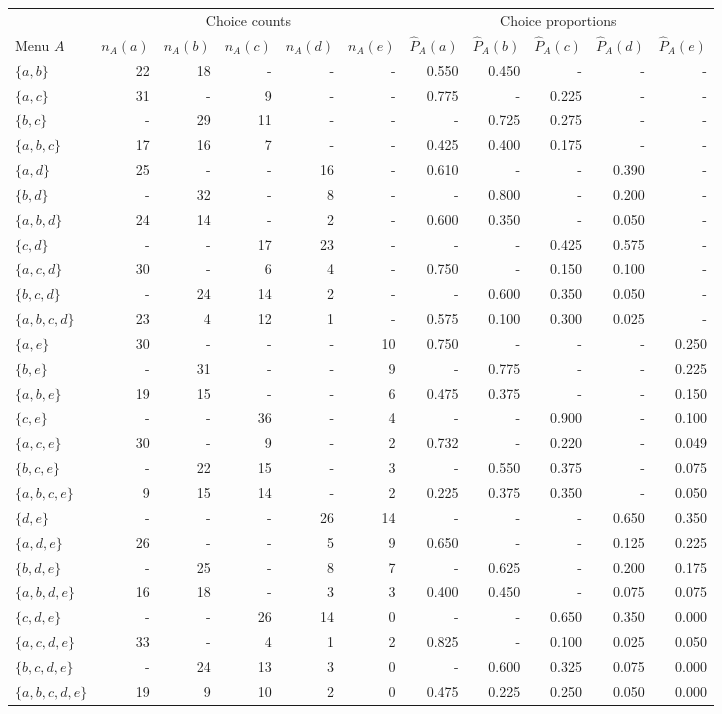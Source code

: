 
\begin{tabular}{lrrrrrrrrrr}
\toprule
\multicolumn{1}{c}{ } & \multicolumn{5}{c}{Choice counts} & \multicolumn{5}{c}{Choice proportions} \\
\cmidrule(l{3pt}r{3pt}){2-6} \cmidrule(l{3pt}r{3pt}){7-11}
Menu $A$ & $n_A(a)$ & $n_A(b)$ & $n_A(c)$ & $n_A(d)$ & $n_A(e)$ & $\hat P_A(a)$ & $\hat P_A(b)$ & $\hat P_A(c)$ & $\hat P_A(d)$ & $\hat P_A(e)$\\
\midrule
$\{a,b\}$ & 22 & 18 & - & - & - & 0.550 & 0.450 & - & - & -\\
$\{a,c\}$ & 31 & - & 9 & - & - & 0.775 & - & 0.225 & - & -\\
$\{b,c\}$ & - & 29 & 11 & - & - & - & 0.725 & 0.275 & - & -\\
$\{a,b,c\}$ & 17 & 16 & 7 & - & - & 0.425 & 0.400 & 0.175 & - & -\\
$\{a,d\}$ & 25 & - & - & 16 & - & 0.610 & - & - & 0.390 & -\\
\addlinespace
$\{b,d\}$ & - & 32 & - & 8 & - & - & 0.800 & - & 0.200 & -\\
$\{a,b,d\}$ & 24 & 14 & - & 2 & - & 0.600 & 0.350 & - & 0.050 & -\\
$\{c,d\}$ & - & - & 17 & 23 & - & - & - & 0.425 & 0.575 & -\\
$\{a,c,d\}$ & 30 & - & 6 & 4 & - & 0.750 & - & 0.150 & 0.100 & -\\
$\{b,c,d\}$ & - & 24 & 14 & 2 & - & - & 0.600 & 0.350 & 0.050 & -\\
\addlinespace
$\{a,b,c,d\}$ & 23 & 4 & 12 & 1 & - & 0.575 & 0.100 & 0.300 & 0.025 & -\\
$\{a,e\}$ & 30 & - & - & - & 10 & 0.750 & - & - & - & 0.250\\
$\{b,e\}$ & - & 31 & - & - & 9 & - & 0.775 & - & - & 0.225\\
$\{a,b,e\}$ & 19 & 15 & - & - & 6 & 0.475 & 0.375 & - & - & 0.150\\
$\{c,e\}$ & - & - & 36 & - & 4 & - & - & 0.900 & - & 0.100\\
\addlinespace
$\{a,c,e\}$ & 30 & - & 9 & - & 2 & 0.732 & - & 0.220 & - & 0.049\\
$\{b,c,e\}$ & - & 22 & 15 & - & 3 & - & 0.550 & 0.375 & - & 0.075\\
$\{a,b,c,e\}$ & 9 & 15 & 14 & - & 2 & 0.225 & 0.375 & 0.350 & - & 0.050\\
$\{d,e\}$ & - & - & - & 26 & 14 & - & - & - & 0.650 & 0.350\\
$\{a,d,e\}$ & 26 & - & - & 5 & 9 & 0.650 & - & - & 0.125 & 0.225\\
\addlinespace
$\{b,d,e\}$ & - & 25 & - & 8 & 7 & - & 0.625 & - & 0.200 & 0.175\\
$\{a,b,d,e\}$ & 16 & 18 & - & 3 & 3 & 0.400 & 0.450 & - & 0.075 & 0.075\\
$\{c,d,e\}$ & - & - & 26 & 14 & 0 & - & - & 0.650 & 0.350 & 0.000\\
$\{a,c,d,e\}$ & 33 & - & 4 & 1 & 2 & 0.825 & - & 0.100 & 0.025 & 0.050\\
$\{b,c,d,e\}$ & - & 24 & 13 & 3 & 0 & - & 0.600 & 0.325 & 0.075 & 0.000\\
\addlinespace
$\{a,b,c,d,e\}$ & 19 & 9 & 10 & 2 & 0 & 0.475 & 0.225 & 0.250 & 0.050 & 0.000\\
\bottomrule
\end{tabular}
